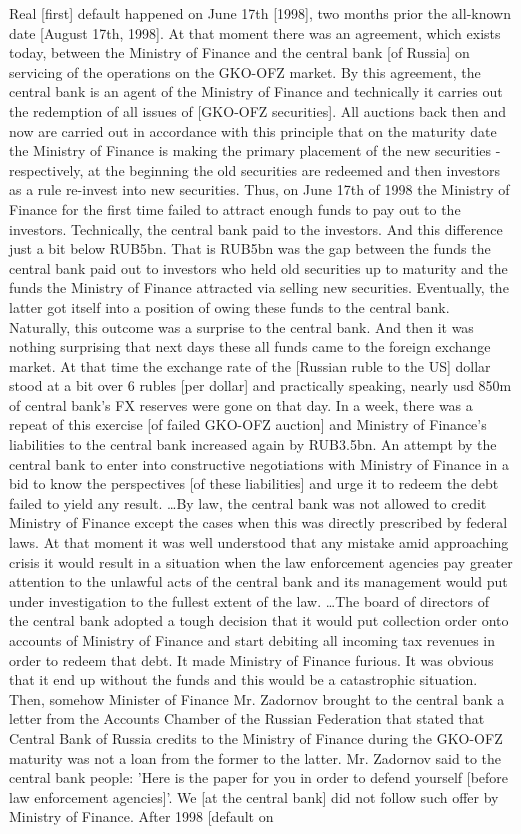 Real [first] default happened on June 17th [1998], two months prior the all-known date [August 17th, 1998]. At that moment there was an agreement, which exists today, between the Ministry of Finance and the central bank [of Russia] on servicing of the operations on the GKO-OFZ market. By this agreement, the central bank is an agent of the Ministry of Finance and technically it carries out the redemption of all issues of [GKO-OFZ securities]. All auctions back then and now are carried out in accordance with this principle that on the maturity date the Ministry of Finance is making the primary placement of the new securities - respectively, at the beginning the old securities are redeemed and then investors as a rule re-invest into new securities. Thus, on June 17th of 1998 the Ministry of Finance for the first time failed to attract enough funds to pay out to the investors. Technically, the central bank paid to the investors. And this difference just a bit below RUB5bn. That is RUB5bn was the gap between the funds the central bank paid out to investors who held old securities up to maturity and the funds the Ministry of Finance attracted via selling new securities. Eventually, the latter got itself into a position of owing these funds to the central bank. Naturally, this outcome was a surprise to the central bank. And then it was nothing surprising that next days these all funds came to the foreign exchange market. At that time the exchange rate of the [Russian ruble to the US] dollar stood at a bit over 6 rubles [per dollar] and practically speaking, nearly \ac{usd} 850m of central bank's FX reserves were gone on that day. In a week, there was a repeat of this exercise [of failed GKO-OFZ auction] and Ministry of Finance's liabilities to the central bank increased again by RUB3.5bn. An attempt by the central bank to enter into constructive negotiations with Ministry of Finance in a bid to know the perspectives [of these liabilities] and urge it to redeem the debt failed to yield any result. \dots By law, the central bank was not allowed to credit Ministry of Finance except the cases when this was directly prescribed by federal laws. At that moment it was well understood that any mistake amid approaching crisis it would result in a situation when the law enforcement agencies pay greater attention to the unlawful acts of the central bank and its management would put under investigation to the fullest extent of the law. \dots The board of directors of the central bank adopted a tough decision that it would put collection order onto accounts of Ministry of Finance and start debiting all incoming tax revenues in order to redeem that debt. It made Ministry of Finance furious. It was obvious that it end up without the funds and this would be a catastrophic situation. Then, somehow Minister of Finance Mr. Zadornov brought to the central bank a letter from the Accounts Chamber of the Russian Federation that stated that Central Bank of Russia credits to the Ministry of Finance during the GKO-OFZ maturity was not a loan from the former to the latter. Mr. Zadornov said to the central bank people: 'Here is the paper for you in order to defend yourself [before law enforcement agencies]'. We [at the central bank] did not follow such offer by Ministry of Finance. After 1998 [default on 